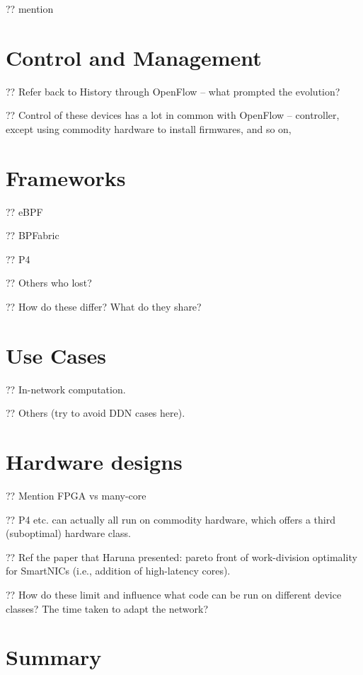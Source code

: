 ?? mention 

\section{Control and Management}

?? Refer back to History through OpenFlow -- what prompted the evolution?

?? Control of these devices has a lot in common with OpenFlow -- controller, except using commodity hardware to install firmwares, and so on,

\section{Frameworks}

?? eBPF

?? BPFabric

?? P4

?? Others who lost?

?? How do these differ? What do they share?

\section{Use Cases}

?? In-network computation.

?? Others (try to avoid DDN cases here).

\section{Hardware designs}

?? Mention FPGA vs many-core

?? P4 etc. can actually all run on commodity hardware, which offers a third (suboptimal) hardware class.

?? Ref the paper that Haruna presented: pareto front of work-division optimality for SmartNICs (i.e., addition of high-latency cores).

?? How do these limit and influence what code can be run on different device classes? The time taken to adapt the network?

\section{Summary}

